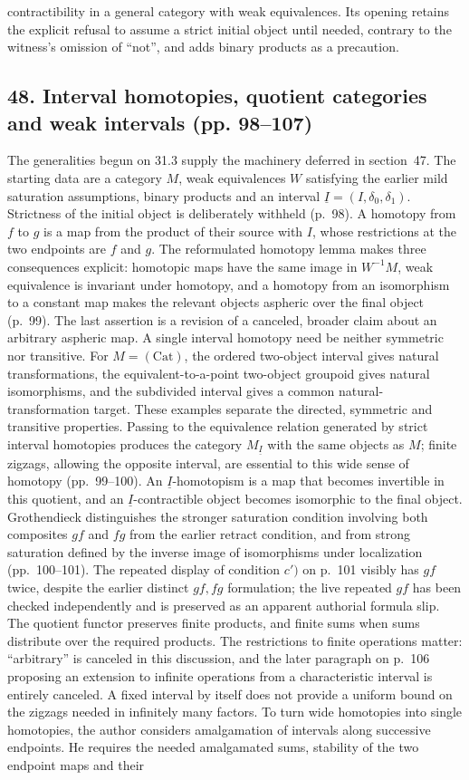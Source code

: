 \documentclass[10pt,oneside]{book}
\begin{document}
contractibility in a general category with weak equivalences. Its opening retains the explicit refusal to assume a strict initial object until needed, contrary to the witness's omission of ``not'', and adds binary products as a precaution.

\subsection*{48. Interval homotopies, quotient categories and weak intervals (pp. 98--107)}
The generalities begun on 31.3 supply the machinery deferred in section~47. The starting data are a category $M$, weak equivalences $W$ satisfying the earlier mild saturation assumptions, binary products and an interval $\underline I=(I,\delta_0,\delta_1)$. Strictness of the initial object is deliberately withheld (p.~98). A homotopy from $f$ to $g$ is a map from the product of their source with $I$, whose restrictions at the two endpoints are $f$ and $g$. The reformulated homotopy lemma makes three consequences explicit: homotopic maps have the same image in $W^{-1}M$, weak equivalence is invariant under homotopy, and a homotopy from an isomorphism to a constant map makes the relevant objects aspheric over the final object (p.~99). The last assertion is a revision of a canceled, broader claim about an arbitrary aspheric map. A single interval homotopy need be neither symmetric nor transitive. For $M=(\mathrm{Cat})$, the ordered two-object interval gives natural transformations, the equivalent-to-a-point two-object groupoid gives natural isomorphisms, and the subdivided interval gives a common natural-transformation target. These examples separate the directed, symmetric and transitive properties. Passing to the equivalence relation generated by strict interval homotopies produces the category $M_{\underline I}$ with the same objects as $M$; finite zigzags, allowing the opposite interval, are essential to this wide sense of homotopy (pp.~99--100). An $\underline I$-homotopism is a map that becomes invertible in this quotient, and an $\underline I$-contractible object becomes isomorphic to the final object. Grothendieck distinguishes the stronger saturation condition involving both composites $gf$ and $fg$ from the earlier retract condition, and from strong saturation defined by the inverse image of isomorphisms under localization (pp.~100--101). The repeated display of condition $c')$ on p.~101 visibly has $gf$ twice, despite the earlier distinct $gf,fg$ formulation; the live repeated $gf$ has been checked independently and is preserved as an apparent authorial formula slip. The quotient functor preserves finite products, and finite sums when sums distribute over the required products. The restrictions to finite operations matter: ``arbitrary'' is canceled in this discussion, and the later paragraph on p.~106 proposing an extension to infinite operations from a characteristic interval is entirely canceled. A fixed interval by itself does not provide a uniform bound on the zigzags needed in infinitely many factors. To turn wide homotopies into single homotopies, the author considers amalgamation of intervals along successive endpoints. He requires the needed amalgamated sums, stability of the two endpoint maps and their 
\end{document}
